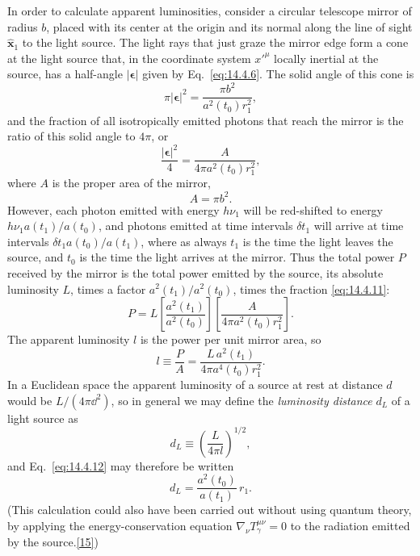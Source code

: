 In order to calculate apparent luminosities, consider a circular telescope
mirror of radius \(b\), placed with its center at the origin and its normal
along the line of sight \(\widehat{\mathbf{x}}_1\) to the light source. The
light rays that just graze the mirror edge form a cone at the light source
that, in the coordinate system \(x'^\mu\) locally inertial at the source,
has a half-angle \(\lvert\boldsymbol{\epsilon}\rvert\) given by
Eq.~\eqref{eq:14.4.6}. The solid angle of this cone is
\[
  \pi\lvert\boldsymbol{\epsilon}\rvert^2
  =
  \frac{\pi b^2}{a^2(t_0)r_1^2},
\]
and the fraction of all isotropically emitted photons that reach the mirror
is the ratio of this solid angle to \(4\pi\), or
\begin{equation}
  \frac{\lvert\boldsymbol{\epsilon}\rvert^2}{4}
  =
  \frac{A}{4\pi a^2(t_0)r_1^2},
  \tag{14.4.11}\label{eq:14.4.11}
\end{equation}
where \(A\) is the proper area of the mirror,
\[
  A=\pi b^2.
\]
However, each photon emitted with energy \(h\nu_1\) will be red-shifted to
energy \(h\nu_1a(t_1)/a(t_0)\), and photons emitted at time intervals
\(\delta t_1\) will arrive at time intervals
\(\delta t_1a(t_0)/a(t_1)\), where as always \(t_1\) is the time the light
leaves the source, and \(t_0\) is the time the light arrives at the mirror.
Thus the total power \(P\) received by the mirror is the total power emitted
by the source, its absolute luminosity \(L\), times a factor
\(a^2(t_1)/a^2(t_0)\), times the fraction \eqref{eq:14.4.11}:
\[
  P
  =
  L
  \left[\frac{a^2(t_1)}{a^2(t_0)}\right]
  \left[\frac{A}{4\pi a^2(t_0)r_1^2}\right].
\]
The apparent luminosity \(l\) is the power per unit mirror area, so
\begin{equation}
  l
  \equiv
  \frac{P}{A}
  =
  \frac{L\,a^2(t_1)}{4\pi a^4(t_0)r_1^2}.
  \tag{14.4.12}\label{eq:14.4.12}
\end{equation}
In a Euclidean space the apparent luminosity of a source at rest at distance
\(d\) would be \(L/(4\pi \dd^2)\), so in general we may define the
\emph{luminosity distance} \(d_L\) of a light source as
\begin{equation}
  d_L\equiv\left(\frac{L}{4\pi l}\right)^{1/2},
  \tag{14.4.13}\label{eq:14.4.13}
\end{equation}
and Eq.~\eqref{eq:14.4.12} may therefore be written
\begin{equation}
  d_L=\frac{a^2(t_0)}{a(t_1)}\,r_1.
  \tag{14.4.14}\label{eq:14.4.14}
\end{equation}
(This calculation could also have been carried out without using quantum
theory, by applying the energy-conservation equation
\(\nabla_\nu T_\gamma^{\mu\nu}=0\) to the radiation emitted by the
source.\hyperref[ch14-ref-15]{[15]})

